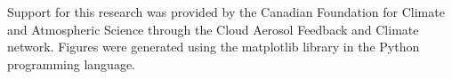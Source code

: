\documentclass[acp]{copernicus}
\begin{document}





\begin{acknowledgements}
Support for this research was provided by the Canadian Foundation for Climate 
and Atmospheric Science through the Cloud Aerosol Feedback and Climate 
network.  Figures were generated using the matplotlib library in the Python
programming language.
\end{acknowledgements}

















\end{document}

